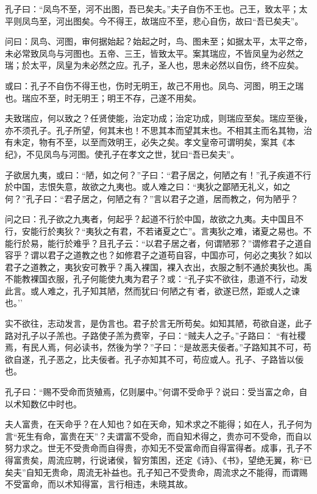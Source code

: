 \documentclass[]{article}
\begin{document}
孔子曰：``凤鸟不至，河不出图，吾已矣夫。''夫子自伤不王也。己王，致太平；太平则凤鸟至，河出图矣。今不得王，故瑞应不至，悲心自伤，故曰``吾已矣夫''。

问曰：凤鸟、河图，审何据始起？始起之时，鸟、图未至；如据太平，太平之帝，未必常致凤鸟与河图也。五帝、三王，皆致太平。案其瑞应，不皆凤皇为必然之瑞；於太平，凤皇为未必然之应。孔子，圣人也，思未必然以自伤，终不应矣。

或曰：孔子不自伤不得王也，伤时无明王，故己不用也。凤鸟、河图，明王之瑞也。瑞应不至，时无明王；明王不存，己遂不用矣。

夫致瑞应，何以致之？任贤使能，治定功成；治定功成，则瑞应至矣。瑞应至後，亦不须孔子。孔子所望，何其末也！不思其本而望其末也。不相其主而名其物，治有未定，物有不至，以至而效明王，必失之矣。孝文皇帝可谓明矣，案其《本纪》，不见凤鸟与河图。使孔子在孝文之世，犹曰``吾已矣夫''。

子欲居九夷，或曰：``陋，如之何？''子曰：``君子居之，何陋之有！''孔子疾道不行於中国，志恨失意，故欲之九夷也。或人难之曰：``夷狄之鄙陋无礼义，如之何？''孔子曰：``君子居之，何陋之有？''言以君子之道，居而教之，何为陋乎？

问之曰：孔子欲之九夷者，何起乎？起道不行於中国，故欲之九夷。夫中国且不行，安能行於夷狄？``夷狄之有君，不若诸夏之亡''。言夷狄之难，诸夏之易也。不能行於易，能行於难乎？且孔子云：``以君子居之者，何谓陋邪？''谓修君子之道自容乎？谓以君子之道教之也？如修君子之道苟自容，中国亦可，何必之夷狄？如以君子之道教之，夷狄安可教乎？禹入裸国，裸入衣出，衣服之制不通於夷狄也。禹不能教裸国衣服，孔子何能使九夷为君子？或：``孔子实不欲往，患道不行，动发此言。或人难之，孔子知其陋，然而犹曰`何陋之有'者，欲遂已然，距或人之谏也。''

实不欲往，志动发言，是伪言也。君子於言无所苟矣。如知其陋，苟欲自遂，此子路对孔子以子羔也。子路使子羔为费宰，子曰：``贼夫人之子。''子路曰：
``有社稷焉，有民人焉，何必读书，然後为学？''子曰：``是故恶夫佞者。''子路知其不可，苟欲自遂，孔子恶之，比夫佞者。孔子亦知其不可，苟应或人。孔子、子路皆以佞也。

孔子曰：``赐不受命而货殖焉，亿则屡中。''何谓不受命乎？说曰：受当富之命，自以术知数亿中时也。

夫人富贵，在天命乎？在人知也？如在天命，知术求之不能得；如在人，孔子何为言``死生有命，富贵在天''？夫谓富不受命，而自知术得之，贵亦可不受命，而自以努力求之。世无不受贵命而自得贵，亦知无不受富命而自得富得者。成事，孔子不得富贵矣，周流应聘，行说诸侯，智穷策困，还定《诗》、《书》，望绝无翼，称``已矣夫''自知无贵命，周流无补益也。孔子知己不受贵命，周流求之不能得，而谓赐不受富命，而以术知得富，言行相违，未晓其故。
\end{document}
